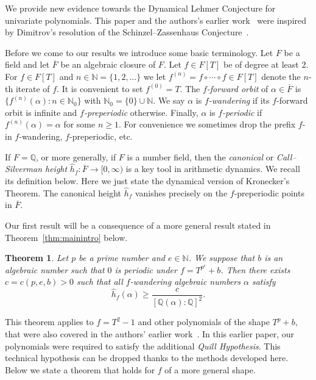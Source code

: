 \documentclass[12pt,oneside,a4]{amsart}
\newcommand{\IN}{\mathbb{N}}
\newcommand{\IQ}{\mathbb{Q}}
\newcounter{maincounter}
\numberwithin{maincounter}{section}
\numberwithin{equation}{section}
\newtheorem{theorem}[maincounter]{Theorem}
\begin{document}
We provide new evidence towards the Dynamical Lehmer Conjecture for
univariate polynomials. This paper and the authors's earlier
work~\cite{hs:2021lower} were inspired by Dimitrov's
resolution of the Schinzel--Zassenhaus Conjecture~\cite{dimitrov:SZ}.

Before we come to our results we introduce some basic terminology. 
Let $F$ be a field and let $\overline F$ be an algebraic closure of
$F$. Let $f\in F[T]$ be of degree at least $2$. For $f\in F[T]$ and
$n\in\IN=\{1,2,\ldots\}$
we let $f^{(n)} = f\circ\cdots\circ f \in F[T]$ denote the
$n$-th iterate of $f$. It is convenient to set $f^{(0)}=T$. The
\textit{$f$-forward orbit} of $\alpha\in\overline F$ is
$\{f^{(n)}(\alpha) : n\in \IN_0\}$ with
$\IN_0= \{0\}\cup\IN$. We say  $\alpha$ is
 \emph{$f$-wandering} if its $f$-forward orbit is infinite
and \emph{$f$-preperiodic} otherwise. Finally, $\alpha$ is
\emph{$f$-periodic} if $f^{(n)}(\alpha)=\alpha$ for some $n\ge 1$. 
For convenience we sometimes
drop the prefix $f$- in $f$-wandering, $f$-preperiodic, etc.

If $F=\IQ$,
or more generally, if $F$ is a number field,
then the \emph{canonical} or \emph{Call--Silverman height} $\widehat h_f\colon
\overline F\rightarrow [0,\infty)$ is a key tool in arithmetic
dynamics. We recall its definition below. Here we just state the
dynamical version of Kronecker's Theorem. The canonical height
$\widehat h_f$ vanishes precisely on the $f$-preperiodic points in
$\overline F$.

Our first result will be a consequence of a
more general result stated in Theorem~\ref{thm:mainintro} below.

\begin{theorem}
  \label{thm:unicriticalwandering}
  Let $p$ be a prime number and $e\in\IN$.  
  We suppose that $b$ is an algebraic number such that  
  $0$ is periodic under $f = T^{p^e} + b$. Then there
  exists $c=c(p,e,b)>0$ such that all  
  $f$-wandering algebraic numbers $\alpha$ satisfy
  \begin{equation*}
    \hat h_f(\alpha) \ge \frac{c}{[\IQ(\alpha):\IQ]^2}. 
  \end{equation*}
\end{theorem}

This theorem applies to $f=T^2-1$ and other
polynomials of the shape $T^p+b$, that were 
also covered in the authors' earlier work~\cite{hs:2021lower}. In this
earlier paper, our polynomials were required to satisfy
the additional \textit{Quill Hypothesis}. This technical hypothesis
can be dropped thanks to the methods developed here.
Below we state a theorem that holds for $f$ of a more general shape.
\end{document}
